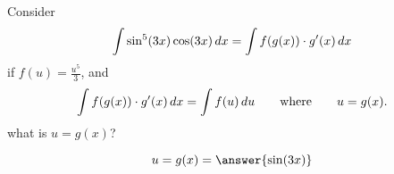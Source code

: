 \documentclass{ximera}
\begin{document}
\begin{problem}
  Consider
  \[
  \int \sin^5(3x) \cos(3x) \,d x = \int f(g(x)) \cdot g'(x) \,d x
  \]
  if $f(u) = \frac{u^5}{3}$, and 
  \[
  \int f(g(x)) \cdot g'(x) \,d x = \int f(u) \,d
  u\qquad\text{where}\qquad u = g(x).
  \]
  what is $u=g(x)$?
  \begin{prompt}
    \[
    u=g(x) = \answer{\sin(3 x)}
    \]
  \end{prompt}
\end{problem}


\end{document}
